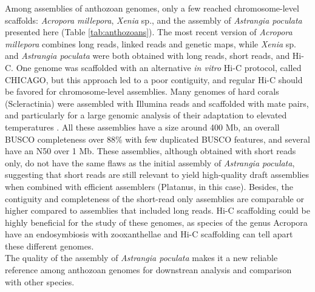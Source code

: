 Among assemblies of anthozoan genomes, only a few reached chromosome-level scaffolds: \textit{Acropora millepora}, \textit{Xenia} sp., and the assembly of \textit{Astrangia poculata} presented here (Table \ref{tab:anthozoans}). The most recent version of \textit{Acropora millepora} combines long reads, linked reads and genetic maps, while \textit{Xenia} sp. and \textit{Astrangia poculata} were both obtained with long reads, short reads, and Hi-C. One genome was scaffolded with an alternative \textit{in vitro} Hi-C protocol, called CHICAGO, but this approach led to a poor contiguity, and regular Hi-C should be favored for chromosome-level assemblies. Many genomes of hard corals (Scleractinia) were assembled with Illumina reads and scaffolded with mate pairs, and particularly for a large genomic analysis of their adaptation to elevated temperatures \cite{acropora_digitifera2}. All these assemblies have a size around 400 Mb, an overall BUSCO completeness over 88\% with few duplicated BUSCO features, and several have an N50 over 1 Mb. These assemblies, although obtained with short reads only, do not have the same flaws as the initial assembly of \textit{Astrangia poculata}, suggesting that short reads are still relevant to yield high-quality draft assemblies when combined with efficient assemblers (Platanus, in this case). Besides, the contiguity and completeness of the short-read only assemblies are comparable or higher compared to assemblies that included long reads. Hi-C scaffolding could be highly beneficial for the study of these genomes, as species of the genus Acropora have an endosymbiosis with zooxanthellae and Hi-C scaffolding can tell apart these different genomes. \\

The quality of the assembly of \textit{Astrangia poculata} makes it a new reliable reference among anthozoan genomes for downstrean analysis and comparison with other species. \\


